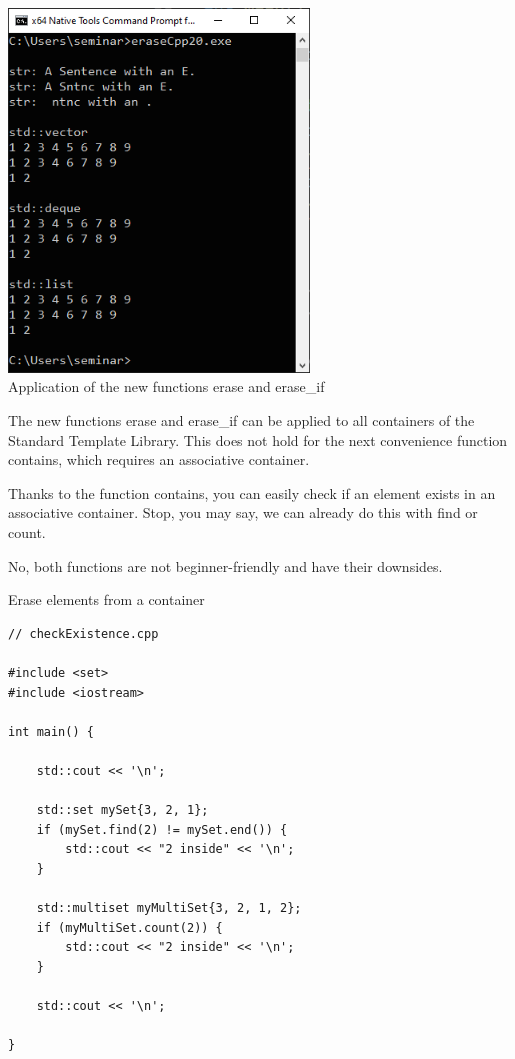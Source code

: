 \begin{center}
\includegraphics[width=0.6\textwidth]{content/3/chapter5/images/13.png}\\
Application of the new functions erase and erase\_if
\end{center}

The new functions erase and erase\_if can be applied to all containers of the Standard Template Library. This does not hold for the next convenience function contains, which requires an associative container.


Thanks to the function contains, you can easily check if an element exists in an associative container.
Stop, you may say, we can already do this with find or count.

No, both functions are not beginner-friendly and have their downsides.

\noindent
Erase elements from a container
\begin{lstlisting}[style=styleCXX]
// checkExistence.cpp

#include <set>
#include <iostream>

int main() {

	std::cout << '\n';
	
	std::set mySet{3, 2, 1};
	if (mySet.find(2) != mySet.end()) {
		std::cout << "2 inside" << '\n';
	}
	
	std::multiset myMultiSet{3, 2, 1, 2};
	if (myMultiSet.count(2)) {
		std::cout << "2 inside" << '\n';
	}
	
	std::cout << '\n';

}
\end{lstlisting}


